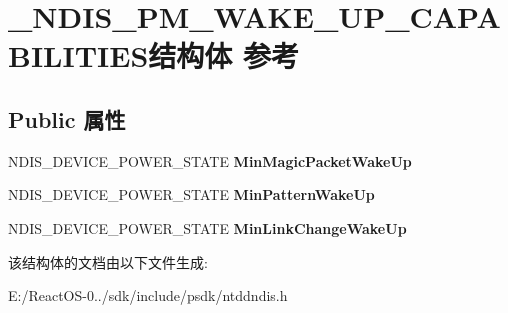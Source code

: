 \hypertarget{struct___n_d_i_s___p_m___w_a_k_e___u_p___c_a_p_a_b_i_l_i_t_i_e_s}{}\section{\+\_\+\+N\+D\+I\+S\+\_\+\+P\+M\+\_\+\+W\+A\+K\+E\+\_\+\+U\+P\+\_\+\+C\+A\+P\+A\+B\+I\+L\+I\+T\+I\+E\+S结构体 参考}
\label{struct___n_d_i_s___p_m___w_a_k_e___u_p___c_a_p_a_b_i_l_i_t_i_e_s}
\subsection*{Public 属性}
\begin{DoxyCompactItemize}
\item 
\mbox{\label{struct___n_d_i_s___p_m___w_a_k_e___u_p___c_a_p_a_b_i_l_i_t_i_e_s_a5bfc4bdfa09349420b4d7d7f6ad9b766}} 
N\+D\+I\+S\+\_\+\+D\+E\+V\+I\+C\+E\+\_\+\+P\+O\+W\+E\+R\+\_\+\+S\+T\+A\+TE {\bfseries Min\+Magic\+Packet\+Wake\+Up}
\item 
\mbox{\label{struct___n_d_i_s___p_m___w_a_k_e___u_p___c_a_p_a_b_i_l_i_t_i_e_s_ab345442bd0409b7ec96384e8d53dc947}} 
N\+D\+I\+S\+\_\+\+D\+E\+V\+I\+C\+E\+\_\+\+P\+O\+W\+E\+R\+\_\+\+S\+T\+A\+TE {\bfseries Min\+Pattern\+Wake\+Up}
\item 
\mbox{\label{struct___n_d_i_s___p_m___w_a_k_e___u_p___c_a_p_a_b_i_l_i_t_i_e_s_ad8f99ba6de1063bdcbf4764a76bc86b4}} 
N\+D\+I\+S\+\_\+\+D\+E\+V\+I\+C\+E\+\_\+\+P\+O\+W\+E\+R\+\_\+\+S\+T\+A\+TE {\bfseries Min\+Link\+Change\+Wake\+Up}
\end{DoxyCompactItemize}


该结构体的文档由以下文件生成\+:\begin{DoxyCompactItemize}
\item 
E\+:/\+React\+O\+S-\/0../sdk/include/psdk/ntddndis.\+h\end{DoxyCompactItemize}
